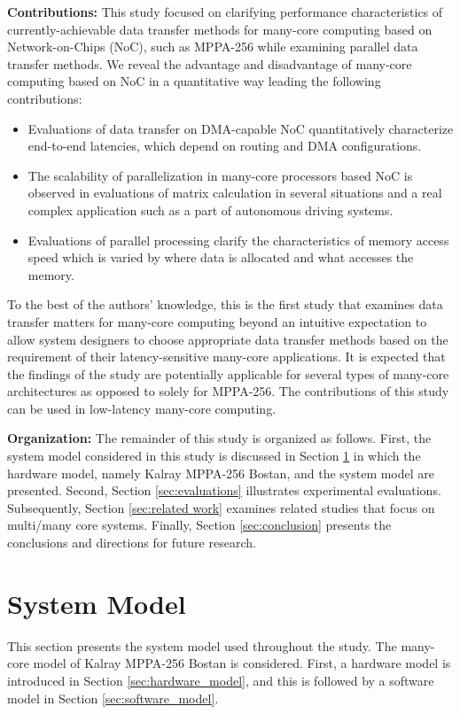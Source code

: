 \documentclass{sig-alternate-05-2015}
\begin{document}
\textbf{Contributions:}
This study focused on clarifying performance characteristics of currently-achievable data transfer methods for many-core computing based on Network-on-Chips (NoC), such as MPPA-256 while examining parallel data transfer methods.
We reveal the advantage and disadvantage of many-core computing based on NoC in a quantitative way leading the following contributions:
\begin{itemize}
\item Evaluations of data transfer on DMA-capable NoC quantitatively characterize end-to-end latencies, which depend on routing and DMA configurations.
\item The scalability of parallelization in many-core processors based NoC is observed in evaluations of matrix calculation in several situations and a real complex application such as a part of autonomous driving systems.
\item Evaluations of parallel processing clarify the characteristics of memory access speed which is varied by where data is allocated and what accesses the memory.
\end{itemize}

To the best of the authors' knowledge, this is the first study that examines data transfer matters for many-core computing beyond an intuitive expectation to allow system designers to choose appropriate data transfer methods based on the requirement of their latency-sensitive many-core applications.
It is expected that the findings of the study are potentially applicable for several types of many-core architectures as opposed to solely for MPPA-256.
The contributions of this study can be used in low-latency many-core computing.

\textbf{Organization:}
The remainder of this study is organized as follows.
First, the system model considered in this study is discussed in Section \ref{sec:system_model} in which the hardware model, namely Kalray MPPA-256 Bostan, and the system model are presented.
Second, Section \ref{sec:evaluations} illustrates experimental evaluations.
Subsequently, Section \ref{sec:related work} examines related studies that focus on multi/many core systems.
Finally, Section \ref{sec:conclusion} presents the conclusions and directions for future research.


\section{System Model}
\label{sec:system_model}
This section presents the system model used throughout the study.
The many-core model of Kalray MPPA-256 Bostan is considered.
First, a hardware model is introduced in Section \ref{sec:hardware_model}, and this is followed by a software model in Section \ref{sec:software_model}.
\end{document}
